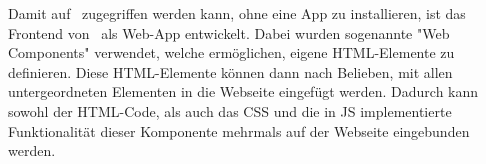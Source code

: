 \label{sec:webcomponents}

Damit auf \ZELIA\ zugegriffen werden kann, ohne eine App zu installieren, ist das Frontend von \ZELIA\ als Web-App entwickelt. Dabei wurden sogenannte "Web Components" verwendet, welche ermöglichen, eigene HTML-Elemente zu definieren. Diese HTML-Elemente können dann nach Belieben, mit allen untergeordneten Elementen in die Webseite eingefügt werden. Dadurch kann sowohl der HTML-Code, als auch das CSS und die in JS implementierte Funktionalität dieser Komponente mehrmals auf der Webseite eingebunden werden.


\pagebreak
